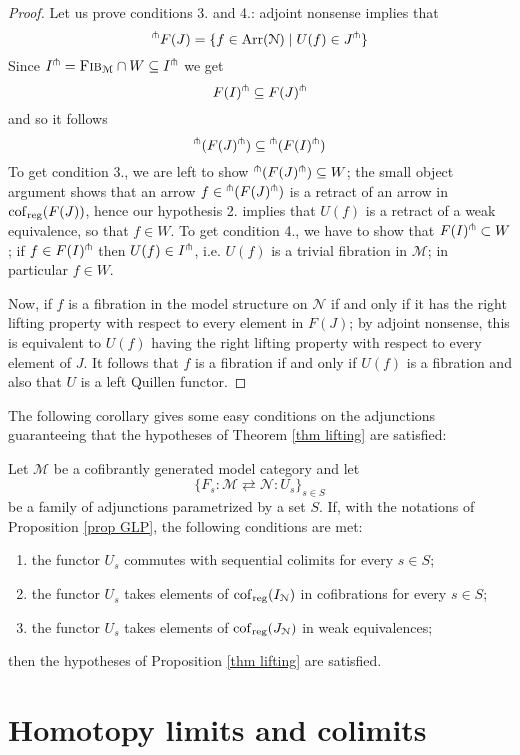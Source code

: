 \begin{refsection}
\begin{proof}
Let us prove conditions 3. and 4.: adjoint nonsense implies that
\[
{}^{\pitchfork}F(J) = \{f \in \mathrm{Arr}(\mathcal N) \mid U(f) \in J^{\pitchfork}\}
\]
Since $I^{\pitchfork} = \textsc{Fib}_{\mathcal M} \cap W \subseteq I^{\pitchfork}$ we get
\[
F(I)^{\pitchfork} \subseteq F(J)^{\pitchfork}
\]
and so it follows
\[
{}^{\pitchfork}(F(J)^{\pitchfork}) \subseteq {}^{\pitchfork}(F(I)^{\pitchfork})
\]
To get condition 3., we are left to show ${}^{\pitchfork}(F(J)^{\pitchfork}) \subseteq W$; the small object argument shows that an arrow $f \in {}^{\pitchfork}(F(J)^{\pitchfork})$ is a retract of an arrow in $\mathrm{cof}_{\mathrm{reg}}(F(J))$, hence our hypothesis 2. implies that $U(f)$ is a retract of a weak equivalence, so that $f \in W$. To get condition 4., we have to show that $F(I)^{\pitchfork} \subset W$; if $f \in F(I)^{\pitchfork}$ then $U(f) \in I^{\pitchfork}$, i.e. $U(f)$ is a trivial fibration in $\mathcal M$; in particular $f \in W$.

Now, if $f$ is a fibration in the model structure on $\mathcal N$ if and only if it has the right lifting property with respect to every element in $F(J)$; by adjoint nonsense, this is equivalent to $U(f)$ having the right lifting property with respect to every element of $J$. It follows that $f$ is a fibration if and only if $U(f)$ is a fibration and also that $U$ is a left Quillen functor.
\end{proof}

The following corollary gives some easy conditions on the adjunctions guaranteeing that the hypotheses of Theorem \ref{thm lifting} are satisfied:

\begin{cor} \label{cor SLP} %
Let $\mathcal M$ be a cofibrantly generated model category and let
\[
\{F_s \colon \mathcal M \rightleftarrows \mathcal N \colon U_s\}_{s \in S}
\]
be a family of adjunctions parametrized by a set $S$. If, with the notations of Proposition \ref{prop GLP}, the following conditions are met:
\begin{enumerate}
\item the functor $U_s$ commutes with sequential colimits for every $s \in S$;
\item the functor $U_s$ takes elements of $\mathrm{cof}_{\mathrm{reg}}(I_{\mathcal N})$ in cofibrations for every $s \in S$;
\item the functor $U_s$ takes elements of $\mathrm{cof}_{\mathrm{reg}}(J_{\mathcal N})$ in weak equivalences;
\end{enumerate}
then the hypotheses of Proposition \ref{thm lifting} are satisfied.
\end{cor}

\section{Homotopy limits and colimits} \label{homotopy limits}


\end{refsection}
